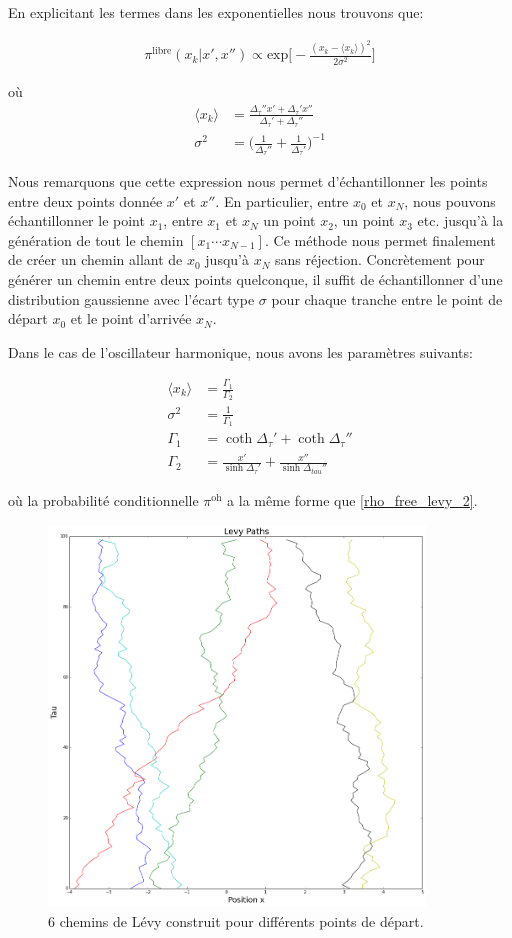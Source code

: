 \documentclass[11pt]{article}
\theoremstyle{definition}
\theoremstyle{remark}
\begin{document}
En explicitant les termes dans les exponentielles nous trouvons que: 

\begin{align} 
\label{rho_free_levy_2}
\pi^{\mathrm{libre}}(x_k|x',x'') \propto \mathrm{exp}\Big[ - \frac{(x_k - \langle x_k \rangle)^2}{2 \sigma^2} \Big]
\end{align}

où 
\begin{align} 
\langle x_k \rangle &= \frac{\Delta_{\tau}'' x' + \Delta_{\tau}'x''}{\Delta_{\tau}' + \Delta_{\tau}''} \\
\sigma^2 &= \Big(\frac{1}{\Delta_{\tau}''} + \frac{1}{\Delta_{\tau}'}\Big)^{-1}
\end{align}

Nous remarquons que cette expression nous permet d'échantillonner les points entre deux points donnée $x'$ et $x''$. En particulier, entre $x_0$ et $x_N$, nous pouvons échantillonner le point $x_1$, entre $x_1$ et $x_N$ un point $x_2$, un point $x_3$ etc. jusqu'à la génération de tout le chemin $[x_1 \cdots x_{N-1}]$. Ce méthode nous permet finalement de créer un chemin allant de $x_0$ jusqu'à $x_N$ sans réjection. Concrètement pour générer un chemin entre deux points quelconque, il suffit de échantillonner d'une distribution gaussienne avec l'écart type $\sigma$ pour chaque tranche entre le point de départ $x_0$ et le point d'arrivée $x_N$. 

Dans le cas de l'oscillateur harmonique, nous avons les paramètres suivants: 

\begin{align}
\label{levy_parameters_ho}
\langle x_k \rangle &= \frac{\Gamma_1}{\Gamma_2} \\
\sigma^2 &= \frac{1}{\Gamma_1} \\
\Gamma_1 &= \coth{\Delta_{\tau}'} + \coth{\Delta_{\tau}''} \\
\Gamma_2 &= \frac{x'}{\sinh{\Delta_{\tau}'}} + \frac{x''}{\sinh{\Delta_{tau}''}}
\end{align}

où la probabilité conditionnelle $\pi^{\mathrm{oh}}$ a la même forme que \eqref{rho_free_levy_2}. 

\begin{figure}[!h]
\label{levy_paths}
\centering 
\includegraphics[width=10cm]{levy_paths.png}
\caption{6 chemins de Lévy construit pour différents points de départ.}
\end{figure} 
\end{document}

